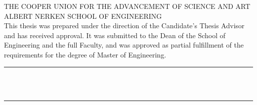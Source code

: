 \thispagestyle{empty}

{
  \large

  \null{}
  \vfill{}

  {
    \centering{}
    \MakeUppercase{
      The Cooper Union for the Advancement of Science and Art \\
      Albert Nerken School of Engineering \\
    }
    \vspace{20pt}
    This thesis was prepared under the direction of the Candidate's Thesis Advisor and has received approval. It was submitted to the Dean of the School of Engineering and the full Faculty, and was approved as partial fulfillment of the requirements for the degree of Master of Engineering.
  }

  \vfill{}

  {
    \raggedleft{}
    \rule{0.5\textwidth}{1pt} \\
     \\
  }

  \vfill{}

  {
    \raggedright{}
    \rule{0.5\textwidth}{1pt} \\
     \\
  }

  \vfill{}

}


